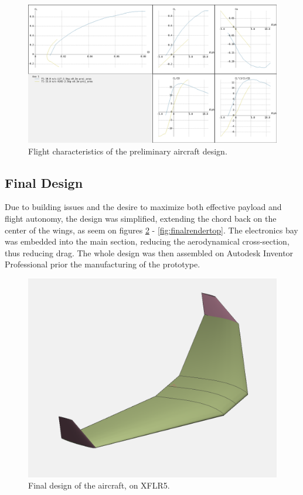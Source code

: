 \begin{figure}
\centering
  \includegraphics[width=\linewidth]{figs/craftpolar.png}
  \caption{Flight characteristics of the preliminary aircraft design.}
  \label{fig:craftpolar}
\end{figure}


\subsection{Final Design}

Due to building issues and the desire to maximize both effective payload and flight autonomy, the design was simplified, extending the chord back on the center of the wings, as seem on figures \ref{fig:final} - \ref{fig:finalrendertop}.
The electronics bay was embedded into the main section, reducing the aerodynamical cross-section, thus reducing drag. The whole design was then assembled on Autodesk Inventor Professional prior the manufacturing of the prototype.
	

\begin{figure}
\centering
  \includegraphics[width=\linewidth]{figs/final.png}
  \caption{Final design of the aircraft, on XFLR5.}
  \label{fig:final}
\end{figure}
	
